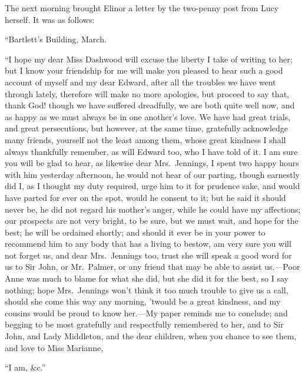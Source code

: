 \documentclass{article}
\begin{document}
The next morning brought Elinor a letter by the
two-penny post from Lucy herself.  It was as follows:

\bigskip
                    ``Bartlett's Building, March.
\medskip

     ``I hope my dear Miss Dashwood will excuse the
     liberty I take of writing to her; but I know your
     friendship for me will make you pleased to hear such
     a good account of myself and my dear Edward, after
     all the troubles we have went through lately,
     therefore will make no more apologies, but proceed
     to say that, thank God! though we have suffered
     dreadfully, we are both quite well now, and as happy
     as we must always be in one another's love.  We have
     had great trials, and great persecutions, but
     however, at the same time, gratefully acknowledge
     many friends, yourself not the least among them,
     whose great kindness I shall always thankfully
     remember, as will Edward too, who I have told of
     it.  I am sure you will be glad to hear, as likewise
     dear Mrs.\ Jennings, I spent two happy hours with
     him yesterday afternoon, he would not hear of our
     parting, though earnestly did I, as I thought my
     duty required, urge him to it for prudence sake,
     and would have parted for ever on the spot, would
     he consent to it; but he said it should never be,
     he did not regard his mother's anger, while he could
     have my affections; our prospects are not very
     bright, to be sure, but we must wait, and hope for
     the best; he will be ordained shortly; and should
     it ever be in your power to recommend him to any
     body that has a living to bestow, am very sure you
     will not forget us, and dear Mrs.\ Jennings too,
     trust she will speak a good word for us to Sir John,
     or Mr.\ Palmer, or any friend that may be able to
     assist us.---Poor Anne was much to blame for what
     she did, but she did it for the best, so I say
     nothing; hope Mrs.\ Jennings won't think it too much
     trouble to give us a call, should she come this way
     any morning, 'twould be a great kindness, and my
     cousins would be proud to know her.---My paper reminds
     me to conclude; and begging to be most gratefully
     and respectfully remembered to her, and to Sir John,
     and Lady Middleton, and the dear children, when you
     chance to see them, and love to Miss Marianne,

\medskip
                                      ``I am, \&c.''
\bigskip
\end{document}
